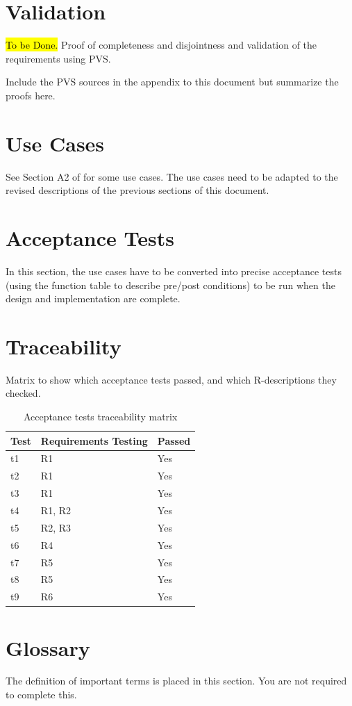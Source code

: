 \documentclass[fontsize=12pt,paper=letter,twoside]{scrartcl}
\begin{document}

\section{Validation}
\hl{To be Done.}
Proof of completeness and disjointness and validation of the requirements using PVS.

Include the PVS sources in the appendix to this document but summarize the proofs here.

\section{Use Cases}
See Section A2 of \cite{REMH} for some use cases. The use cases need to be adapted to the revised descriptions of the previous sections of this document.

\section{Acceptance Tests}
In this section, the use cases have to be converted into precise acceptance tests (using the function table to describe pre/post conditions) to be run when the design and implementation are complete.

\section{Traceability}
Matrix to show which acceptance tests passed, and which R-descriptions they checked.

\begin{table}[htb]
\centering
\label{my-label}
\begin{tabular}{|l|l|l|}
\hline
Test & Requirements Testing & Passed \\ \hline
t1   & R1                   & Yes    \\ \hline
t2   & R1                   & Yes    \\ \hline
t3   & R1                   & Yes    \\ \hline
t4   & R1, R2               & Yes    \\ \hline
t5   & R2, R3               & Yes    \\ \hline
t6   & R4                   & Yes    \\ \hline
t7   & R5                   & Yes    \\ \hline
t8   & R5                   & Yes    \\ \hline
t9   & R6                   & Yes    \\ \hline
\end{tabular}
\caption{Acceptance tests traceability matrix}
\end{table}

\section{Glossary}
The definition of important terms is placed in this section. You are not required to complete this.



\end{document}
